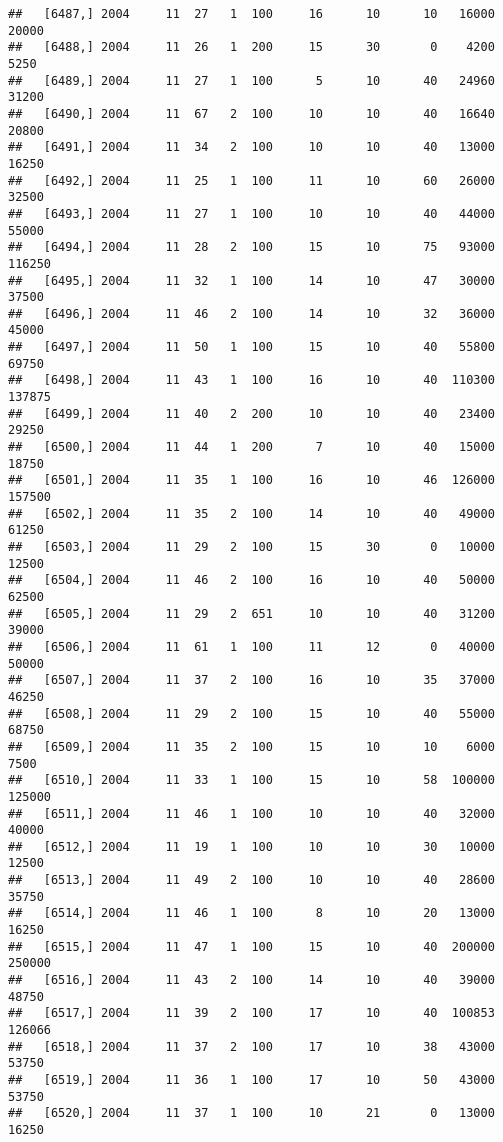 \documentclass{article}\usepackage[]{graphicx}\usepackage[]{color}
\makeatletter
\newenvironment{kframe}{%
 \def\at@end@of@kframe{}%
 \ifinner\ifhmode%
  \def\at@end@of@kframe{\end{minipage}}%
  \begin{minipage}{\columnwidth}%
 \fi\fi%
 \def\FrameCommand##1{\hskip\@totalleftmargin \hskip-\fboxsep
 \colorbox{shadecolor}{##1}\hskip-\fboxsep
     \hskip-\linewidth \hskip-\@totalleftmargin \hskip\columnwidth}%
 \MakeFramed {\advance\hsize-\width
   \@totalleftmargin\z@ \linewidth\hsize
   \@setminipage}}%
 {\par\unskip\endMakeFramed%
 \at@end@of@kframe}
\newenvironment{knitrout}{}{} %
\makeatother
\begin{document}
\begin{knitrout}
\begin{kframe}
\begin{verbatim}
##   [6487,] 2004     11  27   1  100     16      10      10   16000   20000
##   [6488,] 2004     11  26   1  200     15      30       0    4200    5250
##   [6489,] 2004     11  27   1  100      5      10      40   24960   31200
##   [6490,] 2004     11  67   2  100     10      10      40   16640   20800
##   [6491,] 2004     11  34   2  100     10      10      40   13000   16250
##   [6492,] 2004     11  25   1  100     11      10      60   26000   32500
##   [6493,] 2004     11  27   1  100     10      10      40   44000   55000
##   [6494,] 2004     11  28   2  100     15      10      75   93000  116250
##   [6495,] 2004     11  32   1  100     14      10      47   30000   37500
##   [6496,] 2004     11  46   2  100     14      10      32   36000   45000
##   [6497,] 2004     11  50   1  100     15      10      40   55800   69750
##   [6498,] 2004     11  43   1  100     16      10      40  110300  137875
##   [6499,] 2004     11  40   2  200     10      10      40   23400   29250
##   [6500,] 2004     11  44   1  200      7      10      40   15000   18750
##   [6501,] 2004     11  35   1  100     16      10      46  126000  157500
##   [6502,] 2004     11  35   2  100     14      10      40   49000   61250
##   [6503,] 2004     11  29   2  100     15      30       0   10000   12500
##   [6504,] 2004     11  46   2  100     16      10      40   50000   62500
##   [6505,] 2004     11  29   2  651     10      10      40   31200   39000
##   [6506,] 2004     11  61   1  100     11      12       0   40000   50000
##   [6507,] 2004     11  37   2  100     16      10      35   37000   46250
##   [6508,] 2004     11  29   2  100     15      10      40   55000   68750
##   [6509,] 2004     11  35   2  100     15      10      10    6000    7500
##   [6510,] 2004     11  33   1  100     15      10      58  100000  125000
##   [6511,] 2004     11  46   1  100     10      10      40   32000   40000
##   [6512,] 2004     11  19   1  100     10      10      30   10000   12500
##   [6513,] 2004     11  49   2  100     10      10      40   28600   35750
##   [6514,] 2004     11  46   1  100      8      10      20   13000   16250
##   [6515,] 2004     11  47   1  100     15      10      40  200000  250000
##   [6516,] 2004     11  43   2  100     14      10      40   39000   48750
##   [6517,] 2004     11  39   2  100     17      10      40  100853  126066
##   [6518,] 2004     11  37   2  100     17      10      38   43000   53750
##   [6519,] 2004     11  36   1  100     17      10      50   43000   53750
##   [6520,] 2004     11  37   1  100     10      21       0   13000   16250

\end{verbatim}
\end{kframe}
\end{knitrout}
\end{document}

